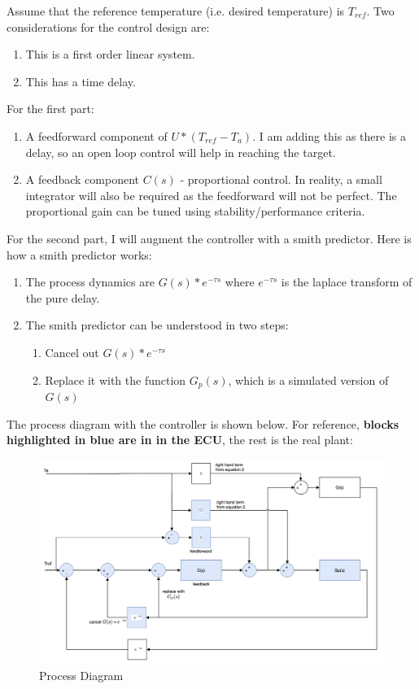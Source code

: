 Assume that the reference temperature (i.e. desired temperature) is \(T_{ref}\).
\noindent
\newline
\newline
Two considerations for the control design are:
\begin{enumerate}
  \item This is a first order linear system.
  \item This has a time delay.
\end{enumerate}
\noindent
For the first part:
\begin{enumerate}
  \item A feedforward component of \(U*(T_{ref} - T_a)\). I am adding this as there is a delay, so an open loop control will help in reaching the target.
  \item A feedback component \(C(s)\) - proportional control. In reality, a small integrator will also be required as the feedforward will not be perfect. The proportional gain can be tuned using stability/performance criteria.
\end{enumerate}
For the second part, I will augment the controller with a smith predictor. Here is how a smith predictor works:
\begin{enumerate}
  \item The process dynamics are \(G(s)*e^{-\tau s}\) where \(e^{-\tau s}\) is the laplace transform of the pure delay.
  \item The smith predictor can be understood in two steps:
  \begin{enumerate}
  \item Cancel out \(G(s)*e^{-\tau s}\)
  \item Replace it with the function \(G_p(s)\), which is a simulated version of \(G(s)\)
  \end{enumerate}
\end{enumerate}

\noindent
\newline
\newline
The process diagram with the controller is shown below. For reference, \textbf{blocks highlighted in \textcolor{TealBlue}{blue} are in in the ECU}, the rest is the real plant: \\

\begin{figure}[h!]
  \includegraphics[width=\textwidth]{control_diagram}
  \caption{Process Diagram}
\end{figure}